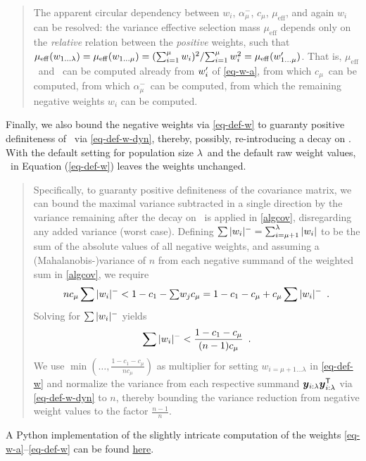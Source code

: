 \documentclass{article} %
\newenvironment{einschub}{%
\begin{small} \begin{quotation}\noindent}{%
  \vspace{0.5ex}\end{quotation}\end{small}%
}
\newcommand{\ve}[1]{\mathchoice{\mbox{\boldmath$\displaystyle#1$}}
  {\mbox{\boldmath$\textstyle#1$}} {\mbox{\boldmath$\scriptstyle#1$}}
  {\mbox{\boldmath$\scriptscriptstyle#1$}}}
\newcommand{\T}{\ensuremath{\mathsf{T}}}
\newcommand{\N}{\ensuremath{n}}
\newcommand{\mueff}{\ensuremath{\mu_\mathrm{eff}}}
\newcommand{\sumw}[1][j]{\ensuremath{{\textstyle\sum{\!w_{#1}}}}}
\newcommand{\alphamuminus}{\ensuremath{\alpha_{\mu}^{-}}}
\newcommand{\summ}[2]{\sum_{#1=1}^{#2}}
\newcommand{\lam}{\ensuremath{\lambda}}
\newcommand{\y}{\ve{y}}
\newcommand{\ilam}{{i:\lam}}
\newcommand{\cone}{\ensuremath{c_1}}
\newcommand{\cmu}{\ensuremath{c_\mu}}
\newcommand{\Eqref}[1]{Equation (\ref{#1})}
\begin{document}
\begin{appendix}
\begin{einschub}
  The apparent circular dependency between $w_i$, \alphamuminus, \cmu, \mueff, 
  and again $w_i$ can be resolved: 
  the variance effective selection mass $\mueff$ depends
  only on the \emph{relative} relation between the \emph{positive} weights, such that
  $\mueff(w_{1\dots\lambda}) = 
   \mueff(w_{1\dots\mu}) = 
   {(\summ{i}{\mu}w_i)^2}/{\summ{i}{\mu}w_i^2} = 
   \mueff(\wa_{1\dots\mu})$. That is, \mueff\ and \mueffminus\ 
   can be 
   computed already from $w'_i$ of \eqref{eq-w-a}, from which \cmu\ can be computed, 
   from which \alphamuminus\ can be computed, from which the remaining negative weights
   $w_i$ can be computed. 
\end{einschub}   
%
  Finally, we also bound the negative weights via \eqref{eq-def-w}
  to guaranty positive definiteness of \C\ via \eqref{eq-def-w-dyn},
  thereby, possibly, re-introducing a decay on \C. 
  With the default setting for population size \lam\ and the default raw weight values, \alphaposdef\ in \Eqref{eq-def-w} leaves the weights unchanged. 
%
\begin{einschub}
\begin{sloppypar}\noindent
Specifically, to guaranty positive definiteness of the covariance matrix, we can bound the maximal variance subtracted in a single direction by the variance remaining after the decay on \C\ is applied in \eqref{algcov}, disregarding any added variance (worst case).
Defining $\negsum{w_i} = \sum_{i=\mu+1}^{\lam}|w_i|$ to be the sum of the absolute values of all negative weights, and assuming a (Mahalanobis-)variance of $\N$ from each negative summand of the weighted sum in \eqref{algcov}, we require 
\begin{equation}
\N\cmu\negsum{w_i} < 1-\cone-\sumw\cmu = 1-\cone-\cmu + \cmu\negsum{w_i}
\enspace.
\end{equation}
%
Solving for $\sum|w_i|^-$ yields
\begin{equation}
\negsum{w_i} < \frac{1-\cone-\cmu}{(\N-1)\cmu}
\enspace.
\end{equation}
We use $\min(\dots, \frac{1-\cone-\cmu}{\N\cmu})$ as multiplier for setting $w_{i=\mu+1\dots\lam}$ in \eqref{eq-def-w} and normalize the variance from each respective summand $\y_\ilam\y_\ilam^\T$ via \eqref{eq-def-w-dyn} to $\N$, thereby bounding the variance reduction from negative weight values to the factor $\frac{\N-1}{\N}$. 
\end{sloppypar}
\end{einschub}
%
A Python implementation of the slightly intricate computation of the weights \eqref{eq-w-a}--\eqref{eq-def-w} can be found \href{https://gist.github.com/nikohansen/3eb4ef0790ff49276a7be3cdb46d84e9}{here}. 
 

\end{appendix}
\end{document}
